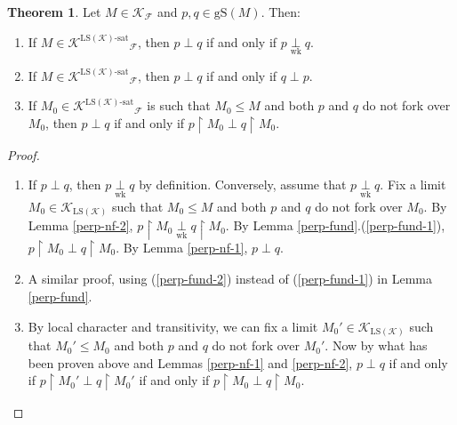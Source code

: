 \documentclass[12pt]{amsart}
\theoremstyle{definition}
\newtheorem{thm}[mydef]{Theorem}
\begin{document}
\begin{thm}\label{perp-global}
  Let $M \in {\mathcal{K}}_{\mathcal{F}}$ and $p, q \in {\text{gS}} (M)$. Then:

  \begin{enumerate}
    \item If $M \in {{{{\mathcal{K}}}^{{{{\text{LS}} ({\mathcal{K}})}}\text{-sat}}}}_{\mathcal{F}}$, then $p \perp q$ if and only if $p {{{{\underset{{{\text{wk}}}}{\overset{{{{}}}}{{\perp}}}}}}} q$.
    \item If $M \in {{{{\mathcal{K}}}^{{{{\text{LS}} ({\mathcal{K}})}}\text{-sat}}}}_{\mathcal{F}}$, then $p \perp q$ if and only if $q \perp p$.
    \item If $M_0 \in {{{{\mathcal{K}}}^{{{{\text{LS}} ({\mathcal{K}})}}\text{-sat}}}}_{\mathcal{F}}$ is such that $M_0 {\le} M$ and both $p$ and $q$ do not fork over $M_0$, then $p \perp q$ if and only if $p {\upharpoonright} M_0 \perp q {\upharpoonright} M_0$.
  \end{enumerate}
\end{thm}
\begin{proof} \
  \begin{enumerate}
  \item If $p \perp q$, then $p {{{{\underset{{{\text{wk}}}}{\overset{{{{}}}}{{\perp}}}}}}} q$ by definition. Conversely, assume that $p {{{{\underset{{{\text{wk}}}}{\overset{{{{}}}}{{\perp}}}}}}} q$. Fix a limit $M_0 \in {\mathcal{K}}_{{\text{LS}} ({\mathcal{K}})}$ such that $M_0 {\le} M$ and both $p$ and $q$ do not fork over $M_0$. By Lemma \ref{perp-nf-2}, $p {\upharpoonright} M_0 {{{{\underset{{{\text{wk}}}}{\overset{{{{}}}}{{\perp}}}}}}} q {\upharpoonright} M_0$. By Lemma \ref{perp-fund}.(\ref{perp-fund-1}), $p {\upharpoonright} M_0 \perp q {\upharpoonright} M_0$. By Lemma \ref{perp-nf-1}, $p \perp q$.
  \item A similar proof, using (\ref{perp-fund-2}) instead of (\ref{perp-fund-1}) in Lemma \ref{perp-fund}.
  \item By local character and transitivity, we can fix a limit $M_0' \in {\mathcal{K}}_{{\text{LS}} ({\mathcal{K}})}$ such that $M_0' {\le} M_0$ and both $p$ and $q$ do not fork over $M_0'$. Now by what has been proven above and Lemmas \ref{perp-nf-1} and \ref{perp-nf-2}, $p \perp q$ if and only if $p {\upharpoonright} M_0' \perp q {\upharpoonright} M_0'$ if and only if $p {\upharpoonright} M_0 \perp q {\upharpoonright} M_0$.
  \end{enumerate}
\end{proof}
\end{document}
